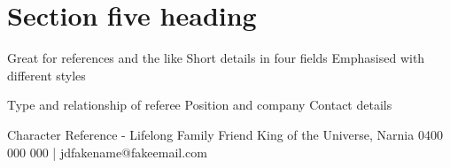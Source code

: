 \section{Section five heading}

 	 {Great for references and the like}
 	 {Short details in four fields}
 	 {Emphasised with different styles}
  	
 	 {Type and relationship of referee}
 	 {Position and company}
 	 {Contact details}
    
 	 {Character Reference - Lifelong Family Friend}
 	 {King of the Universe, Narnia}
 	 {0400 000 000 | jdfakename@fakeemail.com}
